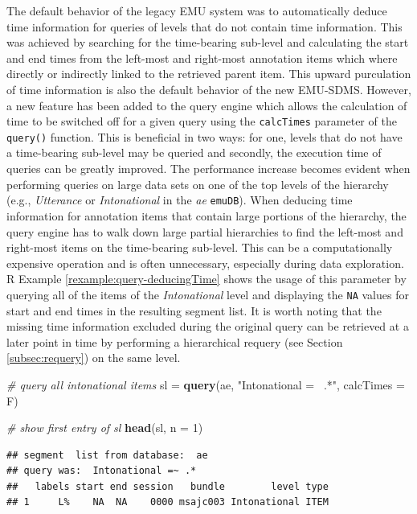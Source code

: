 \documentclass[]{book}
\newenvironment{Shaded}{\begin{snugshade}}{\end{snugshade}}
\newcommand{\CommentTok}[1]{\textcolor[rgb]{0.56,0.35,0.01}{\textit{#1}}}
\newcommand{\DataTypeTok}[1]{\textcolor[rgb]{0.13,0.29,0.53}{#1}}
\newcommand{\DecValTok}[1]{\textcolor[rgb]{0.00,0.00,0.81}{#1}}
\newcommand{\KeywordTok}[1]{\textcolor[rgb]{0.13,0.29,0.53}{\textbf{#1}}}
\newcommand{\NormalTok}[1]{#1}
\newcommand{\StringTok}[1]{\textcolor[rgb]{0.31,0.60,0.02}{#1}}
\theoremstyle{definition}
\theoremstyle{definition}
\theoremstyle{definition}
\theoremstyle{remark}
\begin{document}
The default behavior of the legacy EMU system was to automatically
deduce time information for queries of levels that do not contain time
information. This was achieved by searching for the time-bearing
sub-level and calculating the start and end times from the left-most and
right-most annotation items which where directly or indirectly linked to
the retrieved parent item. This upward purculation of time information
is also the default behavior of the new EMU-SDMS. However, a new feature
has been added to the query engine which allows the calculation of time
to be switched off for a given query using the \texttt{calcTimes}
parameter of the \texttt{query()} function. This is beneficial in two
ways: for one, levels that do not have a time-bearing sub-level may be
queried and secondly, the execution time of queries can be greatly
improved. The performance increase becomes evident when performing
queries on large data sets on one of the top levels of the hierarchy
(e.g., \emph{Utterance} or \emph{Intonational} in the \emph{ae}
\texttt{emuDB}). When deducing time information for annotation items
that contain large portions of the hierarchy, the query engine has to
walk down large partial hierarchies to find the left-most and right-most
items on the time-bearing sub-level. This can be a computationally
expensive operation and is often unnecessary, especially during data
exploration. R Example \ref{rexample:query-deducingTime} shows the usage
of this parameter by querying all of the items of the
\emph{Intonational} level and displaying the \texttt{NA} values for
start and end times in the resulting segment list. It is worth noting
that the missing time information excluded during the original query can
be retrieved at a later point in time by performing a hierarchical
requery (see Section \ref{subsec:requery}) on the same level.

\begin{Shaded}
\begin{Highlighting}[]
\CommentTok{# query all intonational items}
\NormalTok{sl =}\StringTok{ }\KeywordTok{query}\NormalTok{(ae, }\StringTok{"Intonational =~ .*"}\NormalTok{, }\DataTypeTok{calcTimes =}\NormalTok{ F)}

 \CommentTok{# show first entry of sl}
\KeywordTok{head}\NormalTok{(sl, }\DataTypeTok{n =} \DecValTok{1}\NormalTok{)}
\end{Highlighting}
\end{Shaded}

\begin{verbatim}
## segment  list from database:  ae 
## query was:  Intonational =~ .* 
##   labels start end session   bundle        level type
## 1     L%    NA  NA    0000 msajc003 Intonational ITEM
\end{verbatim}
\end{document}
